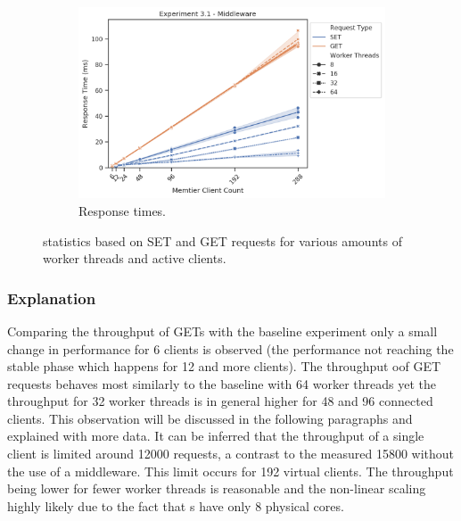 \begin{figure}
{\begin{subfigure}[t!]{0.55\textwidth}
                    \includegraphics[width=1\textwidth]{../data_analysis/figures/3-1_mw_response_time.png}
                    \caption{Response times.\label{fig:single_mw_rt}}
                \end{subfigure}
            }
            \caption{\mw{} statistics based on SET and GET requests for various amounts of worker threads and active
                     clients.\label{fig:single_mw_all}}
        \end{figure}

        \subsubsection{Explanation\label{subsubsec:3_one-middleware_summary}}

            Comparing the throughput of GETs with the baseline experiment only a small change in performance for 6
            clients is observed (the performance not reaching the stable phase which happens for 12 and more clients).
            The throughput oof GET requests behaves most similarly to the baseline with 64 worker threads yet the
            throughput for 32 worker threads is in general higher for 48 and 96 connected clients. This observation will
            be discussed in the following paragraphs and explained with more data. It can be inferred that the
            throughput of a single client is limited around 12000 requests, a contrast to the measured 15800 without the
            use of a middleware. This limit occurs for 192 virtual clients. The throughput being lower for fewer worker
            threads is reasonable and the non-linear scaling highly likely due to the fact that \mw{}s have only 8
            physical cores.

